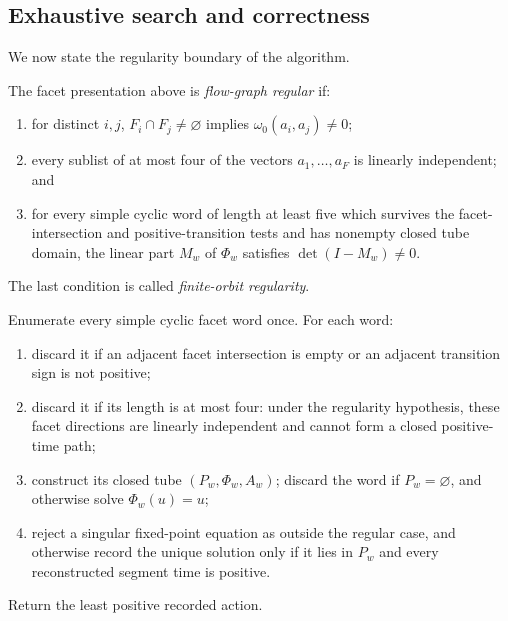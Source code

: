 \FloatBarrier
\subsection{Exhaustive search and correctness}
\label{subsec:flow-graph-algorithm-ch2021-correctness}

We now state the regularity boundary of the algorithm.

\begin{definition}
\label{def:flow-graph-regular-presentation}
The facet presentation above is \emph{flow-graph regular} if:
\begin{enumerate}
  \item for distinct \(i,j\),
    \(F_i\cap F_j\ne\varnothing\) implies
    \(\omega_0(a_i,a_j)\ne0\);
  \item every sublist of at most four of the vectors
    \(a_1,\ldots,a_F\) is linearly independent; and
  \item for every simple cyclic word of length at least five which survives
    the facet-intersection and positive-transition tests and has nonempty
    closed tube domain, the linear part \(M_w\) of \(\Phi_w\) satisfies
    \(\det(I-M_w)\ne0\).
\end{enumerate}
The last condition is called \emph{finite-orbit regularity}.
\end{definition}

\begin{algorithm}
\label{alg:idealized-exhaustive-flow-graph-search}
Enumerate every simple cyclic facet word once.  For each word:
\begin{enumerate}
  \item discard it if an adjacent facet intersection is empty or an adjacent
    transition sign is not positive;
  \item discard it if its length is at most four: under the regularity
    hypothesis, these facet directions are linearly independent and cannot
    form a closed positive-time path;
  \item construct its closed tube \((P_w,\Phi_w,A_w)\); discard the word
    if \(P_w=\varnothing\), and otherwise solve \(\Phi_w(u)=u\);
  \item reject a singular fixed-point equation as outside the regular case,
    and otherwise record the unique solution only if it lies in \(P_w\) and
    every reconstructed segment time is positive.
\end{enumerate}
Return the least positive recorded action.
\end{algorithm}

